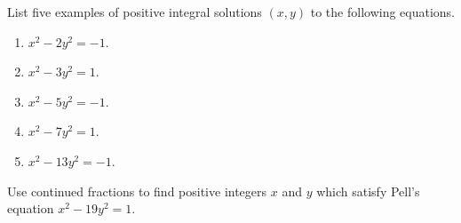\documentclass[12 pt, letterpaper]{hmcpset}
\begin{document}
\begin{problem}[1]
	List five examples of positive integral solutions $(x, y)$ to the following equations.
	\begin{enumerate}
		\item $x^{2} - 2y^{2} = -1$.
		\item $x^{2} - 3y^{2} = 1$.
		\item $x^{2} - 5 y^{2} = -1$.
		\item $x^{2} - 7 y^{2} = 1$.
		\item $x^{2} - 13 y^{2} = -1$.
	\end{enumerate}
\end{problem}

\pagebreak

\begin{problem}[2]
	Use continued fractions to find positive integers $x$ and $y$ which satisfy Pell's equation $x^{2} - 19 y^{2} = 1$.
\end{problem}

\pagebreak
\end{document}
